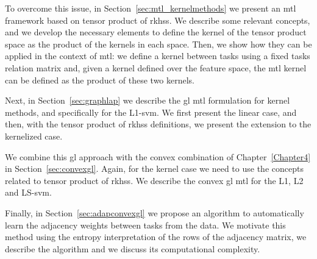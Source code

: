 To overcome this issue, in Section~\ref{sec:mtl_kernelmethods} we present an \acrshort{mtl} framework based on tensor product of \acrshort{rkhss}. We describe some relevant concepts, and we develop the necessary elements to define the kernel of the tensor product space as the product of the kernels in each space. Then, we show how they can be applied in the context of \acrshort{mtl}: we define a kernel between tasks using a fixed tasks relation matrix and, given a kernel defined over the feature space, the \acrshort{mtl} kernel can be defined as the product of these two kernels.

Next, in Section~\ref{sec:graphlap} we describe the \acrshort{gl} \acrshort{mtl} formulation for kernel methods, and specifically for the L1-\acrshort{svm}. We first present the linear case, and then, with the tensor product of \acrshort{rkhss} definitions, we present the extension to the kernelized case.

We combine this \acrshort{gl} approach with the convex combination of Chapter~\ref{Chapter4} in Section~\ref{sec:convexgl}. Again, for the kernel case we need to use the concepts related to tensor product of \acrshort{rkhss}. We describe the convex \acrshort{gl} \acrshort{mtl} for the L1, L2 and LS-\acrshort{svm}.

Finally, in Section~\ref{sec:adapconvexgl} we propose an algorithm to automatically learn the adjacency weights between tasks from the data. We motivate this method using the entropy interpretation of the rows of the adjacency matrix, we describe the algorithm and we discuss its computational complexity.




